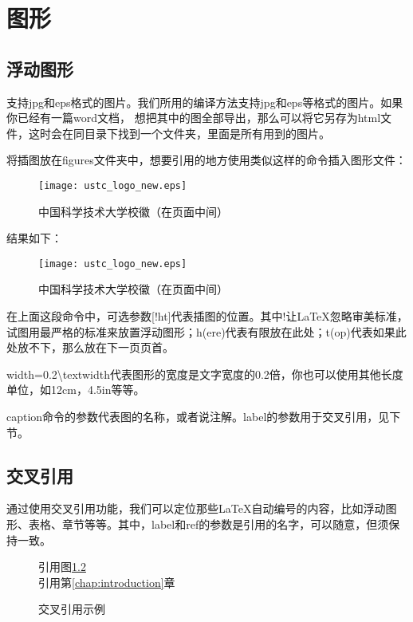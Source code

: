﻿
\chapter{图形}
\label{chap:fig}


\section{浮动图形}

\XeLaTeX 支持jpg和eps格式的图片。我们所用的编译方法支持jpg和eps等格式的图片。如果你已经有一篇word文档，
想把其中的图全部导出，那么可以将它另存为html文件，这时会在同目录下找到一个文件夹，里面是所有用到的图片。

将插图放在figures文件夹中，想要引用的地方使用类似这样的命令插入图形文件：
\begin{code}
\begin{figure}[!ht]
 \centering
 \texttt{[image: ustc\_logo\_new.eps]}
 \caption{中国科学技术大学校徽（在页面中间）}
 \label{fig:ustc1}
\end{figure}
\end{code}
结果如下：
\begin{figure}[!ht]
 \centering
 \texttt{[image: ustc\_logo\_new.eps]}
 \caption{中国科学技术大学校徽（在页面中间）}
 \label{fig:ustc1}
\end{figure}

在上面这段命令中，可选参数[!ht]代表插图的位置。其中!让\LaTeX{}忽略审美标准，试图用最严格的标准来放置浮动图形；h(ere)代表有限放在此处；t(op)代表如果此处放不下，那么放在下一页页首。

width=0.2\textbackslash{}textwidth代表图形的宽度是文字宽度的0.2倍，你也可以使用其他长度单位，如12cm，4.5in等等。

caption命令的参数代表图的名称，或者说注解。label的参数用于交叉引用，见下节。


\section{交叉引用}
通过使用交叉引用功能，我们可以定位那些\LaTeX{}自动编号的内容，比如浮动图形、表格、章节等等。其中，label和ref的参数是引用的名字，可以随意，但须保持一致。
\begin{figure}[ht]
\centering
{}
\hspace{0.1\textwidth}
\begin{minipage}[h]{0.4\textwidth}
\centering
\begin{code}
引用图\ref{fig:ustc1}\\
引用第\ref{chap:introduction}章
\end{code}
\end{minipage}
\caption{交叉引用示例}
\end{figure}



